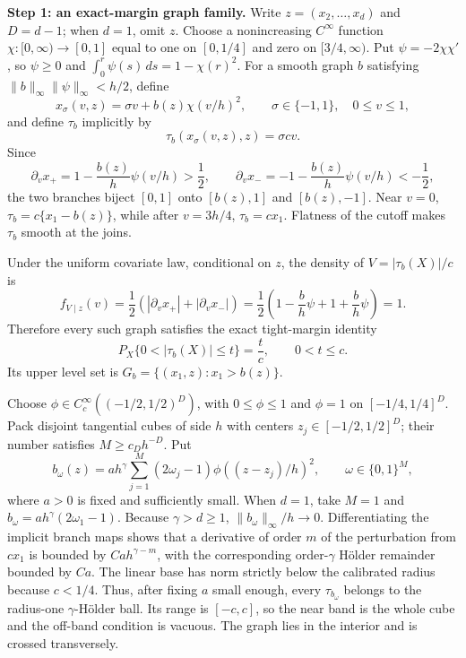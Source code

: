 \textbf{Step 1: an exact-margin graph family.} Write \(z=(x_2,\ldots,x_d)\) and \(D=d-1\); when \(d=1\), omit \(z\). Choose a nonincreasing \(C^\infty\) function \(\chi:[0,\infty)\to[0,1]\) equal to one on \([0,1/4]\) and zero on \([3/4,\infty)\). Put \(\psi=-2\chi\chi'\), so \(\psi\ge0\) and \(\int_0^r\psi(s)\,ds=1-\chi(r)^2\). For a smooth graph \(b\) satisfying \(\|b\|_\infty\|\psi\|_\infty<h/2\), define
\[
x_\sigma(v,z)=\sigma v+b(z)\chi(v/h)^2,
\qquad \sigma\in\{-1,1\},\quad 0\le v\le1,
\]
and define \(\tau_b\) implicitly by
\[
\tau_b(x_\sigma(v,z),z)=\sigma cv.
\]
Since
\[
\partial_vx_+=1-\frac{b(z)}h\psi(v/h)>\frac12,
\qquad
\partial_vx_-=-1-\frac{b(z)}h\psi(v/h)<-\frac12,
\]
the two branches biject \([0,1]\) onto \([b(z),1]\) and \([b(z),-1]\). Near \(v=0\), \(\tau_b=c\{x_1-b(z)\}\), while after \(v=3h/4\), \(\tau_b=cx_1\). Flatness of the cutoff makes \(\tau_b\) smooth at the joins.

Under the uniform covariate law, conditional on \(z\), the density of \(V=|\tau_b(X)|/c\) is
\[
f_{V\mid z}(v)=\frac12\left(|\partial_vx_+|+|\partial_vx_-|\right)
=\frac12\left(1-\frac b h\psi+1+\frac b h\psi\right)=1.
\]
Therefore every such graph satisfies the exact tight-margin identity
\[
P_X\{0<|\tau_b(X)|\le t\}=\frac tc,\qquad 0<t\le c.
\]
Its upper level set is \(G_b=\{(x_1,z):x_1>b(z)\}\).

Choose \(\phi\in C_c^\infty((-1/2,1/2)^D)\), with \(0\le\phi\le1\) and \(\phi=1\) on \([-1/4,1/4]^D\). Pack disjoint tangential cubes of side \(h\) with centers \(z_j\in[-1/2,1/2]^D\); their number satisfies \(M\ge c_Dh^{-D}\). Put
\[
b_\omega(z)=a h^\gamma\sum_{j=1}^M(2\omega_j-1)\phi((z-z_j)/h)^2,
\qquad \omega\in\{0,1\}^M,
\]
where \(a>0\) is fixed and sufficiently small. When \(d=1\), take \(M=1\) and \(b_\omega=a h^\gamma(2\omega_1-1)\). Because \(\gamma>d\ge1\), \(\|b_\omega\|_\infty/h\to0\). Differentiating the implicit branch maps shows that a derivative of order \(m\) of the perturbation from \(cx_1\) is bounded by \(Ca h^{\gamma-m}\), with the corresponding order-\(\gamma\) Hölder remainder bounded by \(Ca\). The linear base has norm strictly below the calibrated radius because \(c<1/4\). Thus, after fixing \(a\) small enough, every \(\tau_{b_\omega}\) belongs to the radius-one \(\gamma\)-Hölder ball. Its range is \([-c,c]\), so the near band is the whole cube and the off-band condition is vacuous. The graph lies in the interior and is crossed transversely.

